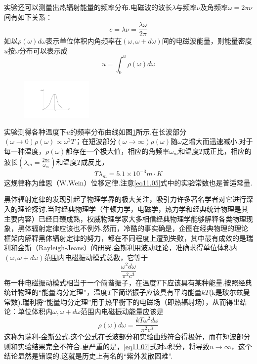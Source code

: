 实验还可以测量出热辐射能量的频率分布.电磁波的波长$\lambda$与频率$\nu$及角频率$\omega=2\pi\nu$间有如下关系：
\begin{equation}\label{eq11.03}
	c=\lambda\nu=\frac{\lambda \omega}{2\pi}
\end{equation}
如以$\rho(\omega)d\omega$表示单位体积内角频率在$(\omega,\omega+d\omega)$间的电磁波能量，则能量密度$u$按$\omega$分布可以表示成
\begin{equation}\label{eq11.04}
	u=\int_{0}^{u} \rho(\omega)d\omega
\end{equation}\eqnormal
\begin{figure}
	\centering
	\includegraphics[width=3.5cm]{QM file/figure/1-2}
	\caption{}\label{fig.1-2}
\end{figure}

实验测得各种温度下$u$的频率分布曲线如图\ref{fig.1-2}所示.在长波部分$(\omega \rightarrow 0)\rho(\omega)\propto \omega^{2}T$；在短波部分$(\omega\rightarrow\infty)\rho(\omega)$随$\omega$之增大而迅速减小.对于每一种温度，$\rho(\omega)$都存在一个极大值，相应的角频率$\omega_{m}$和温度$T$成正比，相应的波长$(\lambda_{m}=\frac{2\pi c}{\omega_{m}})$和温度$T$成反比，
\begin{equation}\label{eq11.05}
	T\lambda_{m}=5.1\times 10^{-3}  \si{m\cdot K}
\end{equation}\eqnormal
这规律称为维恩（W.Wein）位移定律.注意\eqref{eq11.05}式中的实验常数也是普适常量.

黑体辐射定律的发现引起了物理学界的极大关注，吸引力许多著名学者对它进行深入的理论探讨.当时经典物理学（牛顿力学，电磁学，热力学和经典统计物理是其主要内容）已经日臻成熟，权威物理学家大多相信经典物理学能够解释各类物理现象，黑体辐射定律应该也不例外.然而，冷酷的事实确是，企图在经典物理的理论框架内解释黑体辐射定律的努力，都在不同程度上遭到失败，其中最有成效的是瑞利和金斯（Rayleigh-Jeans）的研究.金斯利用波动理论，准确求得单位体积内$(\omega,\omega+d\omega)$范围内电磁振动模式总数，它等于
\begin{equation}\label{eq11.06}
	\frac{\omega^{2}d\omega}{\pi^{2}c^{3}}
\end{equation}
\eqnormal
每一种电磁振动模式相当于一个简谐振子，在温度$T$下应该具有某种能量.按照经典统计物理的“能量均分定理”，温度$T$下简谐振子应该具有平均能量$kT$(k是玻尔兹曼常数).瑞利将“能量均分定理”用于热平衡下的电磁场（即热辐射场），从而得出结论：单位体积内$\omega,\omega+d\omega$范围内电磁振动能量应该是
\begin{equation}\label{eq11.07}
	\rho(\omega)d\omega=\frac{kT\omega^{2}d\omega}{\pi^{2}c^{3}}
\end{equation} 
这称为瑞利-金斯公式.这个公式在长波部分和实验曲线符合得极好，而在短波部分则和实验结果完全不符合.更严重的是，\eqref{eq11.07}式对$\omega$积分，将导致$u\rightarrow\infty$，这个结论显然是错误的.这就是历史上有名的“紫外发散困难”.

